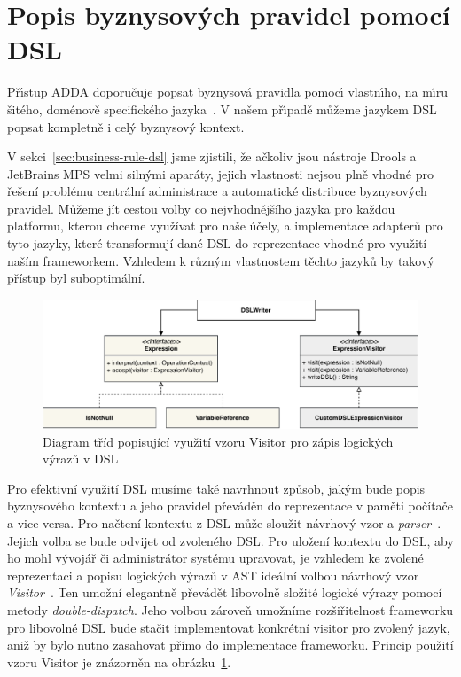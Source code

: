 \section{Popis byznysových pravidel pomocí \gls{DSL}}

Př\'{\i}stup \gls{ADDA} doporučuje popsat byznysová pravidla pomoc\'{\i}
vlastn\'{\i}ho, na m\'{\i}ru šitého, doménově specifického jazyka~\cite{cemus2015automated}.
V našem př\'{\i}padě můžeme jazykem \gls{DSL} popsat kompletně i cel\'y
byznysov\'y kontext.

V sekci~\ref{sec:business-rule-dsl} jsme zjistili, že ačkoliv jsou nástroje Drools a JetBrains
MPS velmi silnými aparáty, jejich vlastnosti nejsou plně vhodné pro řešení problému
centrální administrace a automatické distribuce byznysových pravidel.
Můžeme jít cestou volby co nejvhodnějšího jazyka pro každou platformu, kterou chceme
využívat pro naše účely, a implementace adapterů pro tyto jazyky, které transformují
dané \gls{DSL} do reprezentace vhodné pro využití naším frameworkem. Vzhledem k
různým vlastnostem těchto jazyků by takový přístup byl suboptimální.


\begin{figure}
    \centering
    \includegraphics[keepaspectratio=true, width=1\linewidth]{figures/expression-visitor.pdf}
    \caption{Diagram tříd popisující využití vzoru Visitor pro zápis logických výrazů v \gls{DSL}}
    \label{fig:expression-visitor}
\end{figure}

Pro efektivní využití \gls{DSL} musíme také navrhnout způsob, jakým bude
popis byznysového kontextu a jeho pravidel převáděn do reprezentace v paměti
počítače a vice versa. Pro načtení kontextu z \gls{DSL} může sloužit
návrhový vzor a \textit{parser}~\cite{scott2000programming}. Jejich volba se bude
odvijet od zvoleného \gls{DSL}.
Pro uložení kontextu do \gls{DSL}, aby ho mohl vývojář či administrátor
systému upravovat, je vzhledem ke zvolené reprezentaci a popisu logických
výrazů v \gls{AST} ideální volbou návrhový vzor \textit{Visitor}~\cite{fowler2002patterns}.
Ten umožní elegantně převádět libovolně složité logické výrazy pomocí metody
\textit{double-dispatch}. Jeho volbou zároveň umožníme rozšiřitelnost frameworku
pro libovolné \gls{DSL} \textendash\xspace bude stačit implementovat konkrétní
visitor pro zvolený jazyk, aniž by bylo nutno zasahovat přímo do implementace frameworku.
Princip použití vzoru Visitor je znázorněn na obrázku~\ref{fig:expression-visitor}.

